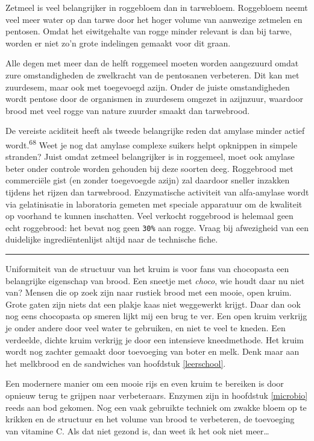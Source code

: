 \documentclass[
  11pt,
  dutch,
]{memoir}
\begin{document}
Zetmeel is veel belangrijker in roggebloem dan in tarwebloem. Roggebloem
neemt veel meer water op dan tarwe door het hoger volume van aanwezige
zetmelen en pentosen. Omdat het eiwitgehalte van rogge minder relevant
is dan bij tarwe, worden er niet zo'n grote indelingen gemaakt voor dit
graan.

Alle degen met meer dan de helft roggemeel moeten worden aangezuurd
omdat zure omstandigheden de zwelkracht van de pentosanen verbeteren.
Dit kan met zuurdesem, maar ook met toegevoegd azijn. Onder de juiste
omstandigheden wordt pentose door de organismen in zuurdesem omgezet in
azijnzuur, waardoor brood met veel rogge van nature zuurder smaakt dan
tarwebrood.

De vereiste aciditeit heeft als tweede belangrijke reden dat amylase
minder actief wordt.\textsuperscript{68} Weet je nog dat amylase
complexe suikers helpt opknippen in simpele stranden? Juist omdat
zetmeel belangrijker is in roggemeel, moet ook amylase beter onder
controle worden gehouden bij deze soorten deeg. Roggebrood met
commerciële gist (en zonder toegevoegde azijn) zal daardoor sneller
inzakken tijdens het rijzen dan tarwebrood. Enzymatische activiteit van
alfa-amylase wordt via gelatinisatie in laboratoria gemeten met speciale
apparatuur om de kwaliteit op voorhand te kunnen inschatten. Veel
verkocht roggebrood is helemaal geen echt roggebrood: het bevat nog geen
\texttt{30\%} aan rogge. Vraag bij afwezigheid van een duidelijke
ingrediëntenlijst altijd naar de technische fiche.

\pfbreak

Uniformiteit van de structuur van het kruim is voor fans van chocopasta
een belangrijke eigenschap van brood. Een sneetje met \emph{choco}, wie
houdt daar nu niet van? Mensen die op zoek zijn naar rustiek brood met
een mooie, open kruim. Grote gaten zijn niets dat een plakje kaas niet
weggewerkt krijgt. Daar dan ook nog eens chocopasta op smeren lijkt mij
een brug te ver. Een open kruim verkrijg je onder andere door veel water
te gebruiken, en niet te veel te kneden. Een verdeelde, dichte kruim
verkrijg je door een intensieve kneedmethode. Het kruim wordt nog
zachter gemaakt door toevoeging van boter en melk. Denk maar aan het
melkbrood en de sandwiches van hoofdstuk \ref{leerschool}.

\label{vitc}

Een modernere manier om een mooie rijs en even kruim te bereiken is door
opnieuw terug te grijpen naar verbeteraars. Enzymen zijn in hoofdstuk
\ref{microbio} reeds aan bod gekomen. Nog een vaak gebruikte techniek om
zwakke bloem op te krikken en de structuur en het volume van brood te
verbeteren, de toevoeging van vitamine C. Als dat niet gezond is, dan
weet ik het ook niet meer\ldots{}
\end{document}
